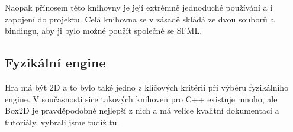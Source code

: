 \documentclass[12pt,a4paper]{article}
\begin{document}
Naopak přínosem této knihovny je její extrémně jednoduché používání a i zapojení
do projektu. Celá knihovna se v zásadě skládá ze dvou souborů a bindingu, aby
ji bylo možné použít společně se SFML.

\subsection{Fyzikální engine}
Hra má být 2D a to bylo také jedno z klíčových kritérií při výběru fyzikálního
engine. V současnosti sice takových knihoven pro C++ existuje mnoho, ale Box2D
je pravděpodobně nejlepší z nich a má velice kvalitní dokumentaci a tutoriály,
vybrali jsme tudíž tu.
\end{document}
